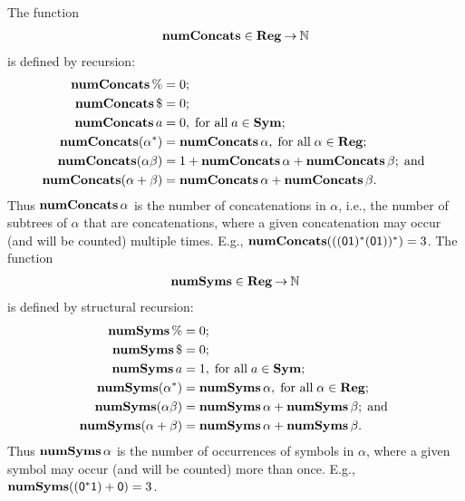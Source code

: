 The function
%
%
%
\begin{gather*}
\mathbf{numConcats}\in\mathbf{Reg}\mathbin{\to}\mathbb{N}
\end{gather*}
is defined by recursion:
\begin{align*}
\mathbf{numConcats}\,\% &= 0 ; \\
\mathbf{numConcats}\,\$ &= 0 ; \\
\mathbf{numConcats}\,a &= 0, \;\allowbreak\mbox{for all}\allowbreak\;a\in\mathbf{Sym} ; \\
\mathbf{numConcats}(\alpha^*) &= \mathbf{numConcats}\,\alpha , \;\allowbreak\mbox{for all}\allowbreak\; \alpha\in\mathbf{Reg} ; \\
\mathbf{numConcats}(\alpha\beta) &= 1 + \mathbf{numConcats}\,\alpha + \mathbf{numConcats}\,\beta ;
\;\allowbreak\mbox{and}\allowbreak\;\\
\mathbf{numConcats}(\alpha + \beta) &= \mathbf{numConcats}\,\alpha + \mathbf{numConcats}\,\beta .
\end{align*}
Thus $\mathbf{numConcats}\,\alpha$ is the number of concatenations in
$\alpha$, i.e., the number of subtrees of $\alpha$ that are
concatenations, where a given concatenation may occur (and will be
counted) multiple times.  E.g.,
$\mathbf{numConcats}(\mathsf{((01)^*(01))^*}) = 3$.  The function
%
%
%
\begin{gather*}
\mathbf{numSyms}\in\mathbf{Reg}\mathbin{\to}\mathbb{N}
\end{gather*}
is defined by structural recursion:
\begin{align*}
\mathbf{numSyms}\,\% &= 0 ; \\
\mathbf{numSyms}\,\$ &= 0 ; \\
\mathbf{numSyms}\,a &= 1, \;\allowbreak\mbox{for all}\allowbreak\;a\in\mathbf{Sym} ; \\
\mathbf{numSyms}(\alpha^*) &= \mathbf{numSyms}\,\alpha , \;\allowbreak\mbox{for all}\allowbreak\; \alpha\in\mathbf{Reg} ; \\
\mathbf{numSyms}(\alpha\beta) &= \mathbf{numSyms}\,\alpha + \mathbf{numSyms}\,\beta ; \;\allowbreak\mbox{and}\allowbreak\;\\
\mathbf{numSyms}(\alpha + \beta) &= \mathbf{numSyms}\,\alpha + \mathbf{numSyms}\,\beta .
\end{align*}
Thus $\mathbf{numSyms}\,\alpha$ is the number of occurrences of symbols in $\alpha$,
where a given symbol may occur (and will be counted) more than once.
E.g., $\mathbf{numSyms}(\mathsf{(0^*1)+0}) = 3$.

